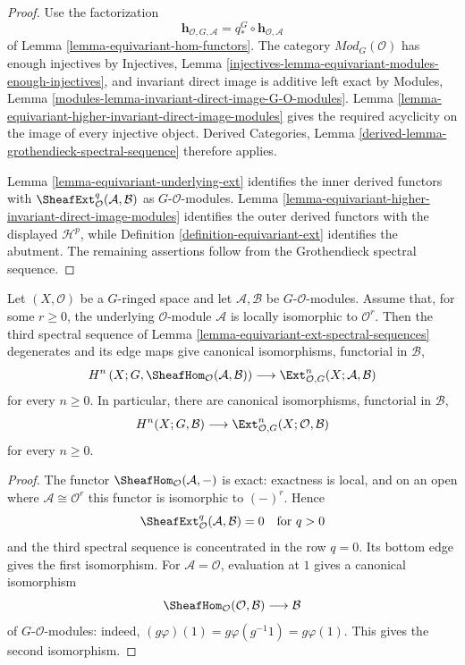 \begin{proof}
Use the factorization
$$
\mathbf h_{\mathcal O,G,\mathcal A}
=
q_*^G\circ\mathbf h_{\mathcal O,\mathcal A}
$$
of Lemma \ref{lemma-equivariant-hom-functors}. The category
$\textit{Mod}_G(\mathcal O)$ has enough injectives by Injectives, Lemma
\ref{injectives-lemma-equivariant-modules-enough-injectives}, and invariant
direct image is additive left exact by Modules, Lemma
\ref{modules-lemma-invariant-direct-image-G-O-modules}. Lemma
\ref{lemma-equivariant-higher-invariant-direct-image-modules} gives the
required acyclicity on the image of every injective object. Derived
Categories, Lemma \ref{derived-lemma-grothendieck-spectral-sequence}
therefore applies.

Lemma \ref{lemma-equivariant-underlying-ext} identifies the inner derived
functors with $\SheafExt^q_{\mathcal O}(\mathcal A,\mathcal B)$ as
$G$-$\mathcal O$-modules. Lemma
\ref{lemma-equivariant-higher-invariant-direct-image-modules} identifies the
outer derived functors with the displayed $\mathcal H^p$, while Definition
\ref{definition-equivariant-ext} identifies the abutment. The remaining
assertions follow from the Grothendieck spectral sequence.
\end{proof}


\begin{lemma}
\label{lemma-equivariant-ext-locally-free}
\begin{reference}
\cite[Chapter V, \S 5.6, p. 218]{Tohoku}
\end{reference}
Let $(X,\mathcal O)$ be a $G$-ringed space and let
$\mathcal A,\mathcal B$ be $G$-$\mathcal O$-modules. Assume that, for some
$r\geq 0$, the underlying $\mathcal O$-module $\mathcal A$ is locally
isomorphic to $\mathcal O^r$. Then the third spectral sequence of Lemma
\ref{lemma-equivariant-ext-spectral-sequences} degenerates and its edge maps
give canonical isomorphisms, functorial in $\mathcal B$,
$$
H^n\left(X;G,\SheafHom_{\mathcal O}(\mathcal A,\mathcal B)\right)
\longrightarrow
\Ext^n_{\mathcal O,G}(X;\mathcal A,\mathcal B)
$$
for every $n\geq 0$. In particular, there are canonical isomorphisms,
functorial in $\mathcal B$,
$$
H^n(X;G,\mathcal B)
\longrightarrow
\Ext^n_{\mathcal O,G}(X;\mathcal O,\mathcal B)
$$
for every $n\geq 0$.
\end{lemma}

\begin{proof}
The functor $\SheafHom_{\mathcal O}(\mathcal A,-)$ is exact: exactness is
local, and on an open where $\mathcal A\cong\mathcal O^r$ this functor is
isomorphic to $(-)^r$. Hence
$$
\SheafExt^q_{\mathcal O}(\mathcal A,\mathcal B)=0
\quad\text{for }q>0
$$
and the third spectral sequence is concentrated in the row $q=0$.
Its bottom edge gives the first isomorphism. For
$\mathcal A=\mathcal O$, evaluation at $1$ gives a canonical isomorphism
$$
\SheafHom_{\mathcal O}(\mathcal O,\mathcal B)
\longrightarrow
\mathcal B
$$
of $G$-$\mathcal O$-modules: indeed,
$(g\varphi)(1)=g\varphi(g^{-1}1)=g\varphi(1)$. This gives the second
isomorphism.
\end{proof}


